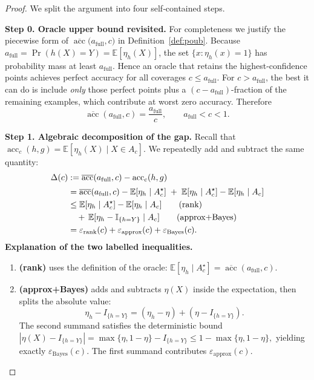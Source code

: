 \begin{proof}
We split the argument into four self‑contained steps.

\textbf{Step 0.  Oracle upper bound revisited.}
For completeness we justify the piecewise form of
\(\overline{\operatorname{acc}}\bigl(a_{\mathrm{full}},c\bigr)\)
in Definition~\ref{def:poub}.
Because
\(a_{\mathrm{full}}=\Pr(h(X)=Y)=\mathbb E[\eta_h(X)]\),
the set
\(\{x:\eta_h(x)=1\}\) has probability mass at least
\(a_{\mathrm{full}}\).  Hence an oracle that retains the
highest‑confidence points achieves perfect accuracy for all
coverages \(c\le a_{\mathrm{full}}\).  For \(c>a_{\mathrm{full}}\),
the best it can do is include \emph{only} those perfect points
plus a \((c-a_{\mathrm{full}})\)-fraction of the remaining
examples, which contribute at worst zero accuracy.  Therefore
\begin{equation}
\overline{\operatorname{acc}}(a_{\mathrm{full}},c)=
\frac{a_{\mathrm{full}}}{c},
\qquad
a_{\mathrm{full}}<c<1.
\end{equation}

\textbf{Step 1.  Algebraic decomposition of the gap.}
Recall that
\(\operatorname{acc}_c(h,g)
   =\mathbb E[\eta_h(X)\mid X\in A_c]\).
We repeatedly add and subtract the same quantity:
\begin{align}
\Delta(c)
&:=\overline{\operatorname{acc}}(a_{\mathrm{full}},c)
  -\operatorname{acc}_c(h,g)  \notag\\[2pt]
&=\overline{\operatorname{acc}}(a_{\mathrm{full}},c)
  -\mathbb E[\eta_h\mid A_c^{\star}]
  \;+\;\mathbb E[\eta_h\mid A_c^{\star}]
  -\mathbb E[\eta_h\mid A_c] \notag\\
&\le
  \mathbb E[\eta_h\mid A_c^{\star}]
  -\mathbb E[\eta_h\mid A_c]                   \tag{rank}\\
&\quad
  +\,\mathbb E[\eta_h-\mathbb{I}_{\{h=Y\}}\mid A_c] \tag{approx+Bayes}\\
&= \varepsilon_{\mathrm{rank}}(c)
   +\varepsilon_{\mathrm{approx}}(c)
   +\varepsilon_{\mathrm{Bayes}}(c).
\end{align}
\textbf{Explanation of the two labelled inequalities.}
\begin{enumerate}
    \item \textbf{(rank)} uses the definition of the oracle:
   \(\mathbb E[\eta_h\mid A_c^{\star}]
   =\overline{\operatorname{acc}}(a_{\mathrm{full}},c)\).
   \item \textbf{(approx+Bayes)} adds and subtracts \(\eta(X)\) inside the
   expectation, then splits the absolute value:
   \begin{equation}
   \eta_h-I_{\{h=Y\}}
   =(\eta_h-\eta)+(\eta-I_{\{h=Y\}}).
   \end{equation}
   The second summand satisfies the deterministic bound
   \(
     |\eta(X)-I_{\{h=Y\}}|
     = \max\{\eta,1-\eta\}-I_{\{h=Y\}}
     \le 1-\max\{\eta,1-\eta\},
   \)
   yielding exactly \(\varepsilon_{\mathrm{Bayes}}(c)\).
   The first summand contributes
   \(\varepsilon_{\mathrm{approx}}(c)\).
\end{enumerate}


\end{proof}
